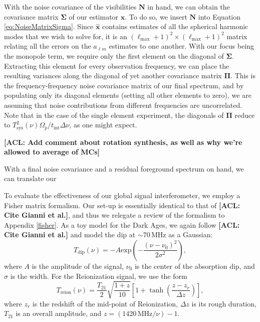 \documentclass[twolcolumn,apj,iop,numberedappendix]{emulateapj}
\newcommand{\xhat}{\hat{\mathbf{x}}}
\newcommand{\N}{\mathbf{N}}
\newcommand{\acl}[1]{{\color{red} \textbf{[ACL:  #1]}}}
\begin{document}
With the noise covariance of the visibilities $\N$ in hand, we can obtain the covariance matrix $\boldsymbol \Sigma$ of our estimator $\xhat$. To do so, we insert $\N$ into Equation \eqref{eq:NoiseMatrixSigma}. Since $\xhat$ contains estimates of all the spherical harmonic modes that we wish to solve for,   it is an $(\ell_\textrm{max} +1)^2 \times (\ell_\textrm{max}+1)^2$ matrix relating all the errors on the $a_{\ell m}$ estimates to one another. With our focus being the monopole term, we require only the first element on the diagonal of $\boldsymbol \Sigma$. Extracting this element for every observation frequency, we can place the resulting variances along the diagonal of yet another covariance matrix $\boldsymbol \Pi$. This is the frequency-frequency noise covariance matrix of our final spectrum, and by populating only its diagonal elements (setting all other elements to zero), we are assuming that noise contributions from different frequencies are uncorrelated. Note that in the case of the single element experiment, the diagonals of $\boldsymbol \Pi$ reduce to $T^2_\textrm{sys}(\nu) \Omega_p / t_\textrm{int} \Delta \nu$, as one might expect.

\acl{Add comment about rotation synthesis, as well as why we're allowed to average of MCs}

With a final noise covariance and a residual foreground spectrum on hand, we can translate our 

To evaluate the effectiveness of our global signal interferometer, we employ a Fisher matrix formalism. Our set-up is essentially identical to that of \acl{Cite Gianni et al.}, and thus we relegate a review of the formalism to Appendix \ref{fisher}. As a toy model for the Dark Ages, we again follow \acl{Cite Gianni et al.} and model the dip at $\sim 70\,\textrm{MHz}$ as a Gaussian:
\begin{equation}
\label{eq:Dip}
T_\textrm{dip}(\nu) = -A \textrm{exp}\left ( -\frac{(\nu - \nu_0)^2}{2\sigma^2} \right ),
\end{equation}
where $A$ is the amplitude of the signal, $\nu_0$ is the center of the absorption dip, and $\sigma$ is the width. For the Reionization signal, we use the form
\begin{equation}
\label{eq:Step}
T_\textrm{reion}(\nu) = \frac{T_{21}}{2} \sqrt{\frac{1+z}{10}}\left[ 1 +  \tanh \left( \frac{z-z_r}{\Delta z} \right)\right],
\end{equation}
where $z_r$ is the redshift of the mid-point of Reionization, $\Delta z$ is its rough duration, $T_{21}$ is an overall amplitude, and $z = (1420 \,\textrm{MHz} / \nu) - 1$.
\end{document}
